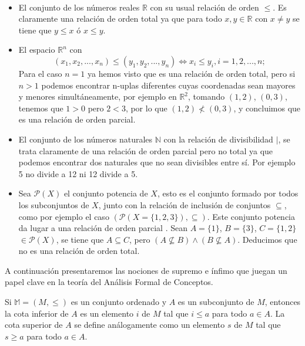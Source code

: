 \documentclass[oneside,openright,titlepage,numbers=noenddot,openany,headinclude,footinclude=true,
cleardoublepage=empty,abstractoff,BCOR=5mm,paper=a4,fontsize=12pt,main=spanish]{scrreprt}
\begin{document}
\begin{exampleth}
\
 
 \begin{itemize}
     \item El conjunto de los números reales  $\mathbb{R}$ con su usual relación de orden \textit{$\leq$}. Es claramente una relación de orden total ya que para todo $x,y \in \mathbb{R}$ con $x \neq y$ se tiene que $y \leq x $ ó $x \leq y$.
     
     \item El espacio $\mathbb{R}^n$ con 
 $$(x_{1},x_{2},...,x_{n}) \leq (y_{1},y_{2},...,y_{n})  \Longleftrightarrow x_{i} \leq y_{i} ,  i=1,2,...,n ;$$ Para el caso $n=1$ ya hemos visto que es una relación de orden total, pero si $n>1$ podemos encontrar n-uplas diferentes cuyas coordenadas sean mayores y menores simultáneamente, por ejemplo en $\mathbb{R}^2$, tomando $(1,2)$, $(0,3)$, tenemos que $1 > 0$ pero $2 < 3$, por lo que $(1,2) \nless (0,3)$, y concluimos que es una relación de orden parcial.
 
    \item El conjunto de los números naturales $\mathbb{N}$ con la relación de divisibilidad $|$, se trata claramente de una relación de orden parcial pero no total ya que podemos encontrar dos naturales que no sean divisibles entre sí. Por ejemplo 5 no divide a 12 ni 12 divide a 5.
    
    \item Sea $\mathcal{P}(X)$ el conjunto potencia de $X$, esto es el conjunto formado por todos los subconjuntos de $X$, junto con la relación de inclusión de conjuntos $\subseteq$, como por ejemplo el caso $(\mathcal{P}(X=\{1,2,3\}),\subseteq)$. Este conjunto potencia da lugar a una relación de orden parcial . Sean $A=\{1\}$, $B=\{3\}$, $C=\{1,2\}$ $\in \mathcal{P}(X)$, se tiene que $A \subseteq C$, pero $(A \nsubseteq B) \wedge (B\nsubseteq A)$. Deducimos que no es una relación de orden total.
 \end{itemize}
 \end{exampleth}

A continuación presentaremos las nociones de supremo e ínfimo que juegan un papel clave en la teoría del Análisis Formal de Conceptos.

\begin{definition} Si $\mathbb{M} = (M, \leq)$ es un conjunto ordenado y $A$ es un subconjunto de $M$, entonces la cota inferior de $A$ es un elemento $i$ de $M$ tal que $i \leq a$ para todo $a \in A$. La cota superior de $A$ se define análogamente como un elemento $s$ de $M$ tal que $s\geq a$ para todo $a \in A$.
\end{definition}
\end{document}
